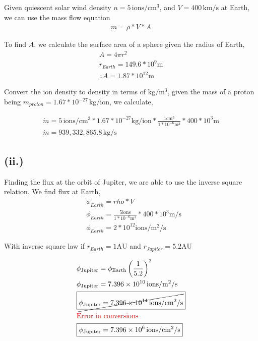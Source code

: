 \documentclass[11pt]{article}
\begin{document}
Given quiescent solar wind density $n = 5 \, \mathrm{ions/cm^3}$,
and $V = 400 \, \mathrm{km/s}$ at Earth, we can use the mass flow equation
\[
\begin{gathered}
    \dot{m} =\rho*V*A
\end{gathered}
\]

To find $A$, we calculate the surface area of a sphere given the radius of Earth,
\[
\begin{gathered}
    A = 4 \pi r^2 \\
    r_{Earth} = 149.6*10^9\mathrm{m} \\
    \therefore A = 1.87*10^{12} \mathrm{m}
\end{gathered}
\]

Convert the ion density to density in terms of $\mathrm{kg/m^3}$, 
given the mass of a proton being $m_{proton} = 1.67 *10^{-27} \, \mathrm{kg/ion}$,
we calculate,

\[
\begin{gathered}
    \dot{m} = {5 \, \mathrm{ions/cm^3}} * 1.67*10^{-27} \mathrm{kg/ion} * \frac{1 \mathrm{cm^3}}{1*10^{-6} \mathrm{m^3}}* 400*10^3 \mathrm{m} \\
    \boxed{\dot{m} = 939,332,865.8 \, \mathrm{kg/s}}
\end{gathered}
\]


\subsection*{(ii.)}

Finding the flux at the orbit of Jupiter, we are able to use the inverse square
relation. We find flux at Earth,
\[
\begin{aligned}
    &\phi_{Earth} =rho * V \\
    &\phi_{Earth} = \frac{5 \mathrm{ions}}{1*10^{-6} \mathrm{m^3}} * 400*10^3 \mathrm{m/s} \\
    &\phi_{Earth} = 2*10^{12} \mathrm{ions/m^2/s}
\end{aligned}
\]

With inverse square law if $r_{Earth} = 1 \mathrm{AU}$ and $r_{Jupiter} = 5.2 \mathrm{AU}$

\[
\begin{aligned}
    &\phi_{\mathrm{Jupiter}} = \phi_{\mathrm{Earth}} \left(\frac{1}{5.2}\right)^2 \\
    &\phi_{\mathrm{Jupiter}} = 7.396 \times 10^{10} \,\mathrm{ions/m^2/s} \\
    &\boxed{\cancel{\phi_{\mathrm{Jupiter}} = 7.396 \times 10^{14} \,\mathrm{ions/cm^2/s}}} \\
    &\textcolor{red}{\text{Error in conversions}} \\
    &\boxed{\phi_{\mathrm{Jupiter}} = 7.396 \times 10^{6} \,\mathrm{ions/cm^2/s}}
\end{aligned}
\]
\end{document}
